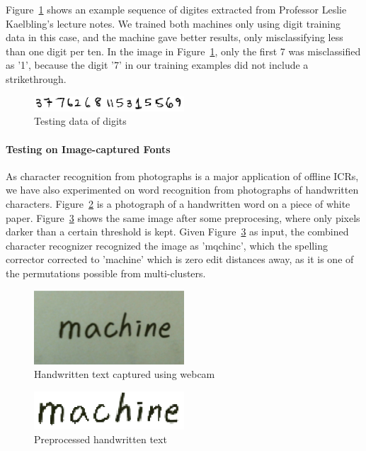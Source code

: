 \documentclass[12pt]{article}
\begin{document}
	Figure~\ref{figure:number} shows an example sequence of digites extracted from Professor Leslie Kaelbling's lecture notes. We trained both machines only using digit training data in this case, and the machine gave better results, only misclassifying less than one digit per ten. In the image in Figure~\ref{figure:number}, only the first 7 was misclassified as '1', because the digit '7' in our training examples did not include a strikethrough.
	
	\begin{figure}[htbp!]
	\centering
	\includegraphics[width=0.5\textwidth]{number.eps}
	\caption{Testing data of digits}
	\label{figure:number}
	\end{figure}
	
	\paragraph{Testing on Image-captured Fonts} As character recognition from photographs is a major application of offline ICRs, we have also experimented on word recognition from photographs of handwritten characters. Figure~\ref{figure:machine_camb} is a photograph of a handwritten word on a piece of white paper. Figure~\ref{figure:machine_cam} shows the same image after some preprocesing, where only pixels darker than a certain threshold is kept. Given Figure~\ref{figure:machine_cam} as input, the combined character recognizer recognized the image as 'mqchinc', which the spelling corrector corrected to 'machine' which is zero edit distances away, as it is one of the permutations possible from multi-clusters.
	
	
	\begin{figure}[htbp!]
	\centering
	\includegraphics[width=0.5\textwidth]{machine_camb.eps}
	\caption{Handwritten text captured using webcam}
	\label{figure:machine_camb}
	\end{figure}
	
	\begin{figure}[htbp!]
	\centering
	\includegraphics[width=0.5\textwidth]{machine_cam.eps}
	\caption{Preprocessed handwritten text}
	\label{figure:machine_cam}
	\end{figure}
	
\end{document}
